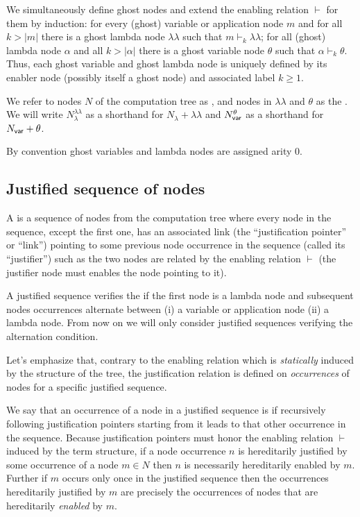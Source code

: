 \documentclass{article}
\theoremstyle{definition}
\newcommand\Nodes{N}%
\newcommand\NodesVar{N_{\sf var}}%
\newcommand\NodesLmd{N_\lambda}%
\newcommand{\ghostlmd}{{\lambda\!\!\lambda}}
\newcommand{\ghostvar}{\theta}
\newcommand{\enables}{\vdash} %
\begin{document}
We simultaneously define ghost nodes and extend the enabling relation $\enables$ for them by induction: for every (ghost) variable or application node $m$ and for all $k>|m|$ there is a ghost lambda node $\ghostlmd$ such that $m \enables_k \ghostlmd$; for all (ghost) lambda node $\alpha$ and all $k>|\alpha|$ there is a ghost variable node $\ghostvar$ such that $\alpha \enables_k \ghostvar$. Thus, each ghost variable and ghost lambda node is uniquely defined by its enabler node (possibly itself a ghost node) and associated label $k\geq 1$.

We refer to nodes $\Nodes$ of the computation tree as , and nodes in $\ghostlmd$ and $\ghostvar$ as the . We will write $\NodesLmd^\ghostlmd$ as a shorthand for $\NodesLmd + \ghostlmd$ and $\NodesVar^\ghostvar$ as a shorthand for $\NodesVar + \ghostvar$.

By convention ghost variables and lambda nodes are assigned arity $0$.

\subsection{Justified sequence of nodes}

A  is a sequence of nodes from the computation tree where every node in the sequence, except the first one, has an associated link (the ``justification pointer'' or ``link'') pointing to some previous node occurrence in the sequence (called its ``justifier'') such as the two nodes are related by the enabling relation $\enables$ (the justifier node must enables the node pointing to it).

A justified sequence verifies the  if the first node is a lambda node and subsequent nodes occurrences alternate between (i) a variable or application node (ii) a lambda node. From now on we will only consider justified sequences verifying the alternation condition.

Let's emphasize that,  contrary to the enabling relation which is \emph{statically} induced by the structure of the tree, the justification relation is defined on \emph{occurrences} of nodes for a specific justified sequence.

We say that an occurrence of a node in a justified sequence is  if recursively following justification pointers starting from it leads to that other occurrence in the sequence. Because justification pointers must honor the enabling relation $\enables$ induced by the term structure, if a node occurrence $n$ is hereditarily justified by some occurrence of a node $m\in\Nodes$ then $n$ is necessarily hereditarily enabled by $m$. Further if $m$ occurs only once in the justified sequence then the occurrences hereditarily justified by $m$ are precisely the occurrences of nodes that are hereditarily \emph{enabled} by $m$.
\end{document}
